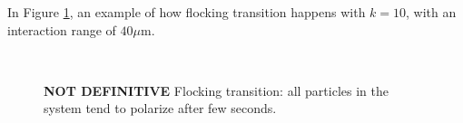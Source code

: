 \documentclass[../../master_thesis_np.tex]{subfiles}
\begin{document}
		In Figure \ref{fig:flock40}, an example of how flocking transition happens with $k = 10$, with an interaction range of $40 \mu \text{m}$.
		\begin{figure}[htp]
			\centering
			\\
			
			\caption{\textbf{NOT DEFINITIVE} Flocking transition: all particles in the system tend to polarize after few seconds. }
			\label{fig:flock40}
		\end{figure}
			
\end{document}
